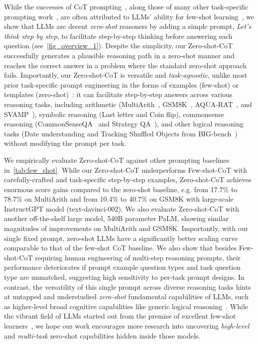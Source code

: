 \documentclass{article}
\newcommand{\ours}{Zero-shot-CoT\xspace}
\newcommand{\theirs}{Few-shot-CoT\xspace}
\begin{document}
While the successes of CoT prompting~\citep{cot_wei}, along those of many other task-specific prompting work~\citep{gao2021making,schick2020s,liu2021pre}, are often attributed to LLMs' ability for few-shot learning~\citep{brown2020language}, we show that LLMs are decent \textit{zero-shot} reasoners by adding a simple prompt, \textit{Let's think step by step}, to facilitate step-by-step thinking before answering each question (see~\autoref{fig_overview_1}). 
Despite the simplicity, our \ours successfully generates a plausible reasoning path in a zero-shot manner and reaches the correct answer in a problem where the standard zero-shot approach fails. 
Importantly, our \ours is versatile and \textit{task-agnostic}, unlike most prior task-specific prompt engineering in the forms of examples (few-shot) or templates (zero-shot)~\citep{liu2021pre}: 
it can facilitate step-by-step answers across various reasoning tasks, including arithmetic (MultiArith~\citep{multiarith}, GSM8K~\citep{gsm8k}, AQUA-RAT~\citep{aqua}, and SVAMP~\citep{svamp}), symbolic reasoning (Last letter and Coin flip), commonsense reasoning (CommonSenseQA~\citep{commonsenseqa} and Strategy QA~\citep{strategyqa}), and other logical reasoning tasks (Date understanding and Tracking Shuffled Objects from BIG-bench~\citep{bigbench}) without modifying the prompt per task.

We empirically evaluate \ours against other prompting baselines in~\autoref{tab:few_shot}. While our \ours underperforms \theirs with carefully-crafted and task-specific step-by-step examples, \ours achieves enormous score gains compared to the zero-shot baseline, e.g. from 17.7\% to 78.7\% on MultiArith and from 10.4\% to 40.7\% on GSM8K with large-scale InstructGPT model (text-davinci-002). 
We also evaluate \ours with another off-the-shelf large model, 540B parameter PaLM, showing similar magnitudes of improvements on MultiArith and GSM8K. 
Importantly, with our single fixed prompt, zero-shot LLMs have a significantly better scaling curve comparable to that of the few-shot CoT baseline. 
We also show that besides \theirs requiring human engineering of multi-step reasoning prompts, their performance deteriorates if prompt example question types and task question type are unmatched, suggesting high sensitivity to per-task prompt designs.   
In contrast, the versatility of this single prompt across diverse reasoning tasks hints at untapped and understudied \textit{zero-shot} fundamental capabilities of LLMs, such as higher-level broad cognitive capabilities like generic logical reasoning~\citep{chollet2019measure}. 
While the vibrant field of LLMs started out from the premise of excellent few-shot learners~\citep{brown2020language}, we hope our work encourages more research into uncovering \textit{high-level} and \textit{multi-task} zero-shot capabilities hidden inside those models. 
\end{document}
